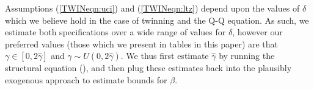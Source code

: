 Assumptions (\ref{TWINeqn:uci}) and (\ref{TWINeqn:ltz}) depend upon the values
of $\delta$ which we believe hold in the case of twinning and the Q-Q equation.
As such, we estimate both specifications over a wide range of values for 
$\delta$, however our preferred values (those which we present in tables in this 
paper) are that $\gamma \in [0,2\hat\gamma]$ and $\gamma \sim U(0,2\hat\gamma)$.
We thus first estimate $\hat\gamma$ by running the structural equation 
(\label{TWINeqn:Conley}), and then plug these estimates back into the 
\citeauthor{Conleyetal2012} plausibly exogenous approach to estimate bounds for
$\beta$.

